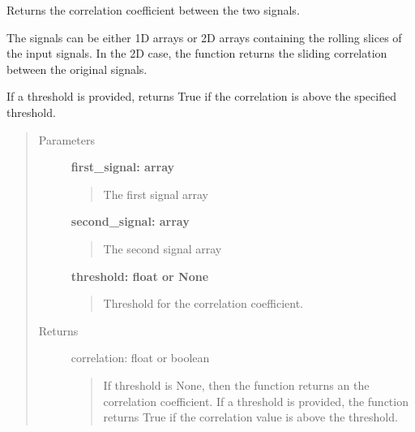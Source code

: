 \documentclass[letterpaper,10pt,english]{sphinxmanual}
\begin{document}
\begin{fulllineitems}
\label{fit_checks:fit_checks.check_correlation}
Returns the correlation coefficient between the two signals.

The signals can be either 1D arrays or 2D arrays containing the rolling slices
of the input signals. In the 2D case, the function returns the sliding correlation
between the original signals.

If a threshold is provided, returns True if
the correlation is above the specified threshold.
\begin{quote}\begin{description}
\item[{Parameters}] \leavevmode
\textbf{first\_signal: array}
\begin{quote}

The first signal array
\end{quote}

\textbf{second\_signal: array}
\begin{quote}

The second signal array
\end{quote}

\textbf{threshold: float or None}
\begin{quote}

Threshold for the correlation coefficient.
\end{quote}

\item[{Returns}] \leavevmode
correlation: float or boolean
\begin{quote}

If threshold is None, then the function returns an the correlation coefficient.
If a threshold is provided, the function returns True if the correlation value is
above the threshold.
\end{quote}

\end{description}\end{quote}

\end{fulllineitems}

\end{document}
